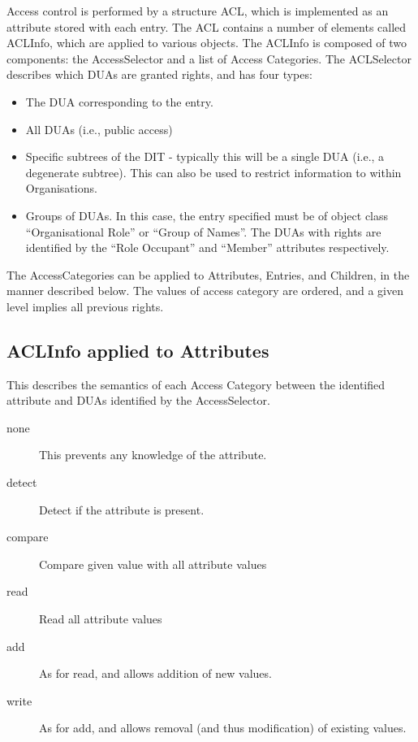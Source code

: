 \clearpage

Access control is performed by a structure ACL, which is implemented as an
attribute stored with each entry.  The ACL contains a number of elements
called ACLInfo, which are applied to various objects.
The ACLInfo is
composed of two components: the AccessSelector and a list of Access
Categories.
The ACLSelector
describes which DUAs are granted rights, and has four types:

\begin {itemize}
\item
The DUA corresponding to the entry.
\item
All DUAs (i.e., public access)
\item
Specific subtrees of the DIT - typically this will be a single DUA (i.e., a
degenerate subtree).
This can also be used to restrict information to within Organisations.
\item
Groups of DUAs.
In this case, the entry specified must be of object class ``Organisational
Role'' or ``Group of Names''.
The DUAs with rights are identified by the ``Role Occupant'' and ``Member''
attributes respectively.
\end {itemize}

The AccessCategories can be applied to Attributes, Entries, and Children, in
the manner described below.
The values of access category are ordered, and a given level implies all
previous rights.

\subsection {ACLInfo applied to Attributes}

This describes the semantics of each Access Category between the identified
attribute and DUAs identified by the AccessSelector.

\begin {description}
\item [none]

This prevents any knowledge of the attribute.
\item [detect]

Detect if the attribute is present.
\item [compare]
Compare given value with all attribute values
\item [read]
Read all attribute values
\item [add]
As for read, and allows addition of new values.
\item [write]
As for add, and allows removal (and thus modification) of
existing values.
\end {description}

